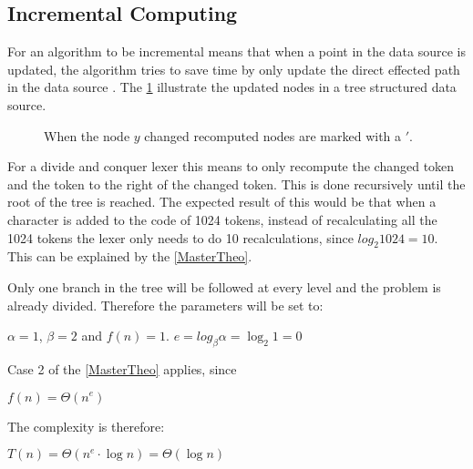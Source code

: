 \subsection{Incremental Computing}
For an algorithm to be incremental means that when a point in the data source
is updated, the algorithm tries to save time by only update the direct effected
path in the data source \cite{incrementalDef}. The \cref{fig:incUp} illustrate
the updated nodes in a tree structured data source.

\begin{figure}[!htp]
\centering
\caption{When the node $y$ changed recomputed nodes are marked with a $'$. \label{fig:incUp}}
\end{figure}

For a divide and conquer lexer this means to only recompute the changed token
and the token to the right of the changed token. This is done recursively until
the root of the tree is reached. The expected result of this would be that when
a character is added to the code of 1024 tokens, instead of recalculating all
the 1024 tokens the lexer only needs to do 10 recalculations, since
$log_2 1024 = 10$. This can be explained by the \cref{MasterTheo}.

Only one branch in the tree will be followed at every level and the problem is
already divided. Therefore the parameters will be set to:
\begin{center}
$\alpha = 1$, $\beta = 2$ and $f(n) = 1$.
$e=log_\beta\alpha=\log_2 1=0$
\end{center}
Case 2 of the \cref{MasterTheo} applies, since
\begin{center}
$f(n) = \Theta(n^e)$
\end{center}
The complexity is therefore:
\begin{center}
$T(n) = \Theta(n^e \cdot \log n) = \Theta(\log n)$
\end{center}

